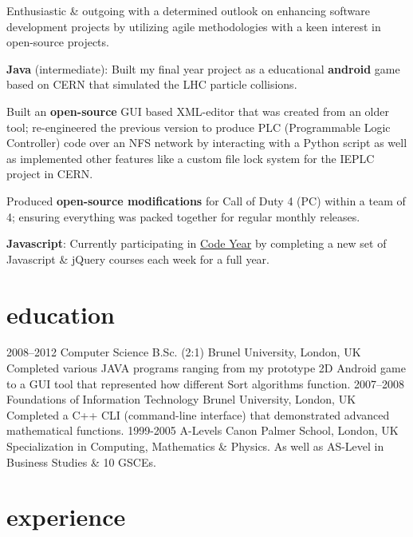 \documentclass[]{friggeri-cv}
\begin{document}
Enthusiastic \& outgoing with a determined outlook on enhancing software development projects by utilizing agile methodologies with a keen interest in open-source projects.

\textbf{Java} (intermediate): Built my final year project as a educational \textbf{android} game based on CERN that simulated the LHC particle collisions.

Built an \textbf{open-source} GUI based XML-editor that was created from an older tool; re-engineered the previous version to produce PLC (Programmable Logic Controller) code over an NFS network by interacting with a Python script as well as implemented other features like a custom file lock system for the IEPLC project in CERN.

Produced \textbf{open-source modifications} for Call of Duty 4 (PC) within a team of 4; ensuring everything was packed together for regular monthly releases.

\textbf{Javascript}: Currently participating in \href{http://codeyear.com}{Code Year} by completing a new set of Javascript \& jQuery courses each week for a full year.


\section{education}

\begin{entrylist}
  \entry
    {2008–2012}
    {Computer Science B.Sc. (2:1)}
    {Brunel University, London, UK}
    {Completed various JAVA programs ranging from my prototype 2D Android game to a GUI tool that represented how different Sort algorithms function.}
  \entry
    {2007–2008}
    {Foundations of Information Technology}
    {Brunel University, London, UK}
    {Completed a C++ CLI (command-line interface) that demonstrated advanced mathematical functions.}
  \entry
    {1999-2005}
    {A-Levels}
    {Canon Palmer School, London, UK}
    {Specialization in Computing, Mathematics \& Physics. As well as AS-Level in Business Studies \& 10 GSCEs.}
\end{entrylist}

\section{experience}
\end{document}
